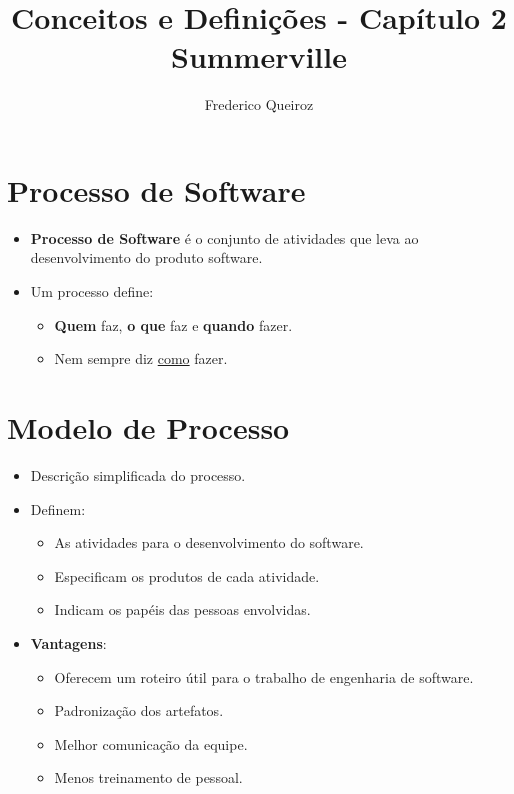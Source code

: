 \documentclass[a4paper, 11pt]{article}
\author{Frederico Queiroz}
\title{Conceitos e Definições - Capítulo 2 Summerville}
\begin{document}
\maketitle

\section{Processo de Software}
\begin{itemize}
	\item \textbf{Processo de Software} é o conjunto de atividades que leva ao desenvolvimento do produto software.
	\item Um processo define:
	\begin{itemize}
        \item \textbf{Quem} faz, \textbf{o que} faz e \textbf{quando} fazer.
        \item Nem sempre diz \underline{como} fazer.
    \end{itemize}
\end{itemize}

\section{Modelo de Processo}
\begin{itemize}
    \item Descrição simplificada do processo.
    \item Definem:
    \begin{itemize}
        \item As atividades para o desenvolvimento do software.
        \item Especificam os produtos de cada atividade.
        \item Indicam os papéis das pessoas envolvidas.
    \end{itemize}
    \item \textbf{Vantagens}:
    \begin{itemize}
        \item Oferecem um roteiro útil para o trabalho de engenharia de software.
        \item Padronização dos artefatos.
        \item Melhor comunicação da equipe.
        \item Menos treinamento de pessoal.
    \end{itemize}
\end{itemize}
\end{document}

